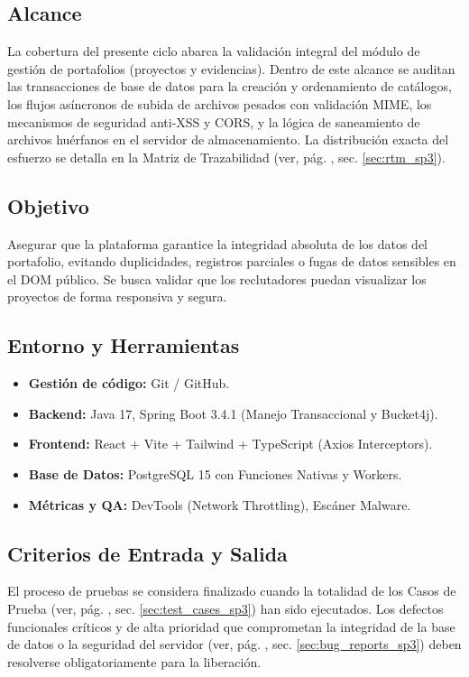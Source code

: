\subsection{Alcance}
La cobertura del presente ciclo abarca la validación integral del módulo de gestión de portafolios (proyectos y evidencias). Dentro de este alcance se auditan las transacciones de base de datos para la creación y ordenamiento de catálogos, los flujos asíncronos de subida de archivos pesados con validación MIME, los mecanismos de seguridad anti-XSS y CORS, y la lógica de saneamiento de archivos huérfanos en el servidor de almacenamiento. La distribución exacta del esfuerzo se detalla en la Matriz de Trazabilidad (ver, pág. \pageref{sec:rtm_sp3}, sec. \ref{sec:rtm_sp3}).

\subsection{Objetivo}
Asegurar que la plataforma garantice la integridad absoluta de los datos del portafolio, evitando duplicidades, registros parciales o fugas de datos sensibles en el DOM público. Se busca validar que los reclutadores puedan visualizar los proyectos de forma responsiva y segura.

\subsection{Entorno y Herramientas}
\begin{itemize}[noitemsep]
    \item \textbf{Gestión de código:} Git / GitHub.
    \item \textbf{Backend:} Java 17, Spring Boot 3.4.1 (Manejo Transaccional y Bucket4j).
    \item \textbf{Frontend:} React + Vite + Tailwind + TypeScript (Axios Interceptors).
    \item \textbf{Base de Datos:} PostgreSQL 15 con Funciones Nativas y Workers.
    \item \textbf{Métricas y QA:} DevTools (Network Throttling), Escáner Malware.
\end{itemize}

\subsection{Criterios de Entrada y Salida}
El proceso de pruebas se considera finalizado cuando la totalidad de los Casos de Prueba (ver, pág. \pageref{sec:test_cases_sp3}, sec. \ref{sec:test_cases_sp3}) han sido ejecutados. Los defectos funcionales críticos y de alta prioridad que comprometan la integridad de la base de datos o la seguridad del servidor (ver, pág. \pageref{sec:bug_reports_sp3}, sec. \ref{sec:bug_reports_sp3}) deben resolverse obligatoriamente para la liberación. 

